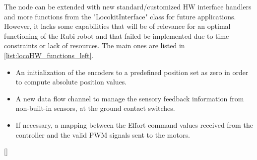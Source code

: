 The node can be extended with new standard/customized HW interface handlers and more functions from the "LocokitInterface" class for future applications.
However, it lacks some capabilities that will be of relevance for an optimal functioning of the Rubi robot and that failed be implemented due to time constraints or lack of resources. 
The main ones are listed in \ref{list:locoHW_functions_left}.

\begin{itemize}
\label{list:locoHW_functions_left}
	\item An initialization of the encoders to a predefined position set as zero in order to compute absolute position values.
	\item A new data flow channel to manage the sensory feedback information from non-built-in sensors, at the ground contact switches.
	\item If necessary, a mapping between the Effort command values received from the controller and the valid PWM signals sent to the motors.  
\end{itemize}

\ref{}

